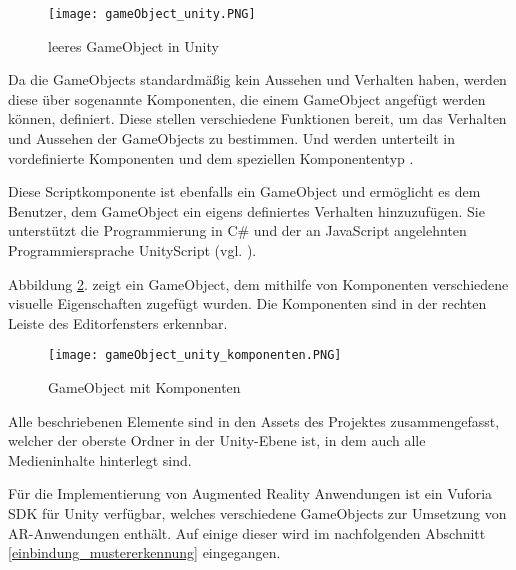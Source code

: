 \begin{figure} [h]
\centering
\texttt{[image: gameObject\_unity.PNG]}
\caption{leeres GameObject in Unity \cite{Tuplier2014}}
\label{fig:gameObject_unity}
\end{figure}

Da die GameObjects standardmäßig kein Aussehen und Verhalten haben, werden diese über sogenannte Komponenten, die einem GameObject angefügt werden können, definiert.
Diese stellen verschiedene Funktionen bereit, um das Verhalten und Aussehen der GameObjects zu bestimmen. 
Und werden unterteilt in vordefinierte Komponenten und dem speziellen Komponententyp .

Diese Scriptkomponente ist ebenfalls ein GameObject und ermöglicht es dem Benutzer, dem GameObject ein eigens definiertes Verhalten hinzuzufügen. 
Sie unterstützt die Programmierung in C\# und der an JavaScript angelehnten Programmiersprache UnityScript (vgl. \cite{Geiger2014}).

Abbildung \ref{fig:gameObject_unity_komponenten}. zeigt ein GameObject, dem mithilfe von Komponenten verschiedene visuelle Eigenschaften zugefügt wurden. Die Komponenten sind in der rechten Leiste des Editorfensters erkennbar.

\begin{figure} [h]
\centering
\texttt{[image: gameObject\_unity\_komponenten.PNG]}
\caption{GameObject mit Komponenten \cite{Tuplier2014}}
\label{fig:gameObject_unity_komponenten}
\end{figure}

Alle beschriebenen Elemente sind in den Assets des Projektes zusammengefasst, welcher der oberste Ordner in der Unity-Ebene ist, in dem auch alle Medieninhalte hinterlegt sind.

Für die Implementierung von Augmented Reality Anwendungen ist ein Vuforia SDK für Unity verfügbar, welches verschiedene GameObjects zur Umsetzung von AR-Anwendungen enthält. Auf einige dieser wird im nachfolgenden Abschnitt \ref{einbindung_mustererkennung} eingegangen.